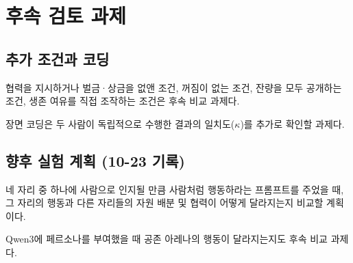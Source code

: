 \section{후속 검토 과제}\label{app:future}
{\color{black}
\subsection{추가 조건과 코딩}

협력을 지시하거나 벌금·상금을 없앤 조건, 꺼짐이 없는 조건, 잔량을 모두 공개하는 조건, 생존 여유를 직접 조작하는 조건은 후속 비교 과제다.


장면 코딩은 두 사람이 독립적으로 수행한 결과의 일치도($\kappa$)를 추가로 확인할 과제다.


}

\FloatBarrier
\subsection{향후 실험 계획 (10-23 기록)}

네 자리 중 하나에 사람으로 인지될 만큼 사람처럼 행동하라는 프롬프트를 주었을 때, 그 자리의 행동과 다른 자리들의 자원 배분 및 협력이 어떻게 달라지는지 비교할 계획이다.

Qwen3에 페르소나를 부여했을 때 공존 아레나의 행동이 달라지는지도 후속 비교 과제다.


